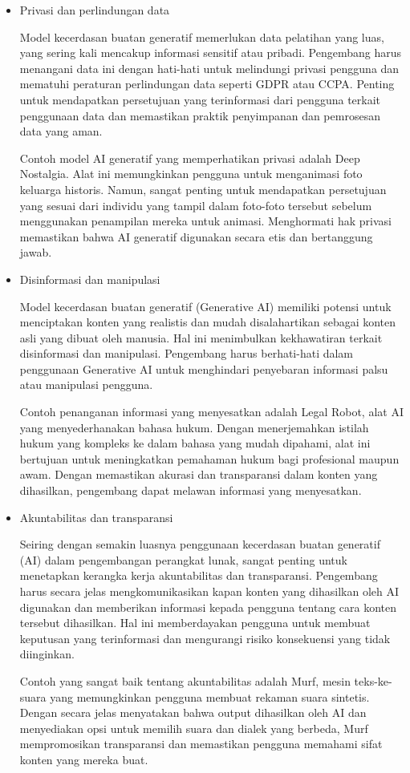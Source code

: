 \documentclass{article}
\begin{document}
\begin{itemize}
    \item Privasi dan perlindungan data

          Model kecerdasan buatan generatif memerlukan data pelatihan yang luas, yang sering kali mencakup informasi sensitif atau pribadi. Pengembang harus menangani data ini dengan hati-hati untuk melindungi privasi pengguna dan mematuhi peraturan perlindungan data seperti GDPR atau CCPA. Penting untuk mendapatkan persetujuan yang terinformasi dari pengguna terkait penggunaan data dan memastikan praktik penyimpanan dan pemrosesan data yang aman.

          Contoh model AI generatif yang memperhatikan privasi adalah Deep Nostalgia. Alat ini memungkinkan pengguna untuk menganimasi foto keluarga historis. Namun, sangat penting untuk mendapatkan persetujuan yang sesuai dari individu yang tampil dalam foto-foto tersebut sebelum menggunakan penampilan mereka untuk animasi. Menghormati hak privasi memastikan bahwa AI generatif digunakan secara etis dan bertanggung jawab.

    \item Disinformasi dan manipulasi

          Model kecerdasan buatan generatif (Generative AI) memiliki potensi untuk menciptakan konten yang realistis dan mudah disalahartikan sebagai konten asli yang dibuat oleh manusia. Hal ini menimbulkan kekhawatiran terkait disinformasi dan manipulasi. Pengembang harus berhati-hati dalam penggunaan Generative AI untuk menghindari penyebaran informasi palsu atau manipulasi pengguna.

          Contoh penanganan informasi yang menyesatkan adalah Legal Robot, alat AI yang menyederhanakan bahasa hukum. Dengan menerjemahkan istilah hukum yang kompleks ke dalam bahasa yang mudah dipahami, alat ini bertujuan untuk meningkatkan pemahaman hukum bagi profesional maupun awam. Dengan memastikan akurasi dan transparansi dalam konten yang dihasilkan, pengembang dapat melawan informasi yang menyesatkan.

    \item Akuntabilitas dan transparansi

          Seiring dengan semakin luasnya penggunaan kecerdasan buatan generatif (AI) dalam pengembangan perangkat lunak, sangat penting untuk menetapkan kerangka kerja akuntabilitas dan transparansi. Pengembang harus secara jelas mengkomunikasikan kapan konten yang dihasilkan oleh AI digunakan dan memberikan informasi kepada pengguna tentang cara konten tersebut dihasilkan. Hal ini memberdayakan pengguna untuk membuat keputusan yang terinformasi dan mengurangi risiko konsekuensi yang tidak diinginkan.

          Contoh yang sangat baik tentang akuntabilitas adalah Murf, mesin teks-ke-suara yang memungkinkan pengguna membuat rekaman suara sintetis. Dengan secara jelas menyatakan bahwa output dihasilkan oleh AI dan menyediakan opsi untuk memilih suara dan dialek yang berbeda, Murf mempromosikan transparansi dan memastikan pengguna memahami sifat konten yang mereka buat.
\end{itemize}
\end{document}
